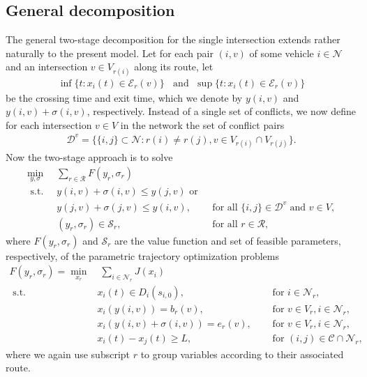 \documentclass[a4paper]{article}
\theoremstyle{definition}
\theoremstyle{plain}
\begin{document}
\subsection{General decomposition}
The general two-stage decomposition for the single intersection extends rather
naturally to the present model. Let for each pair $(i,v)$ of some vehicle
$i \in \mathcal{N}$ and an intersection $v \in V_{r(i)}$ along its route, let
\begin{align*}
\inf \{ t: x_{i}(t) \in \mathcal{E}_{r}(v) \} \;\; \text{ and } \; \sup \{ t: x_{i}(t) \in \mathcal{E}_{r}(v) \}
\end{align*}
be the crossing time and exit time, which we denote by $y(i,v)$ and
$y(i,v) + \sigma(i, v)$, respectively.
%
Instead of a single set of conflicts, we now define for each intersection
$v \in V$ in the network the set of conflict pairs
\begin{align*}
\mathcal{D}^{v} = \{ \{i,j\} \subset \mathcal{N} : r(i) \neq r(j), v \in V_{r(i)} \cap V_{r(j)} \} .
\end{align*}
Now the two-stage approach is to solve
\begin{align*}
  \min_{y,\sigma} \;\; & \sum_{r \in \mathcal{R}} F(y_{r}, \sigma_{r}) \\
  \text{ s.t. } & y(i,v) + \sigma(i,v) \leq y(j,v) \text{ or }  \\
                & y(j,v) + \sigma(j,v) \leq y(i,v) , & \text{ for all } \{i,j\} \in \mathcal{D}^{v} \text{ and } v \in V, \\
  & (y_{r}, \sigma_{r}) \in \mathcal{S}_{r} , \quad & \text{ for all } r \in \mathcal{R} ,
\end{align*}
%
where $F(y_{r}, \sigma_{r})$ and $\mathcal{S}_{r}$ are the value function and
set of feasible parameters, respectively, of the parametric trajectory
optimization problems
%
\begin{align*}
  F(y_{r}, \sigma_{r}) = \min_{x_{r}} & \; \sum_{i \in \mathcal{N}_{r}} J(x_{i}) \\
  \text{ s.t. } & x_{i}(t) \in D_{i}(s_{i,0}) , \quad & \text{ for } i \in \mathcal{N}_{r} , \\
  & x_{i}(y(i,v)) = b_{r}(v) , \quad & \text{ for } v \in V_{r} , i \in \mathcal{N}_{r} , \\
  & x_{i}(y(i,v) + \sigma(i,v)) = e_{r}(v) , \quad & \text{ for } v \in V_{r} , i \in \mathcal{N}_{r} , \\
  & x_{i}(t) - x_{j}(t) \geq L , \quad & \text{ for } (i, j) \in \mathcal{C} \cap \mathcal{N}_{r} ,
\end{align*}
where we again use subscript $r$ to group variables according to their associated route.
\end{document}
